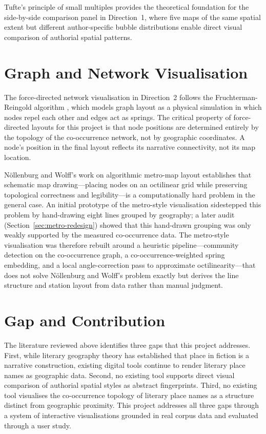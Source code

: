 \documentclass[logo,msc]{infthesis}
\begin{document}
Tufte's principle of small multiples \cite{tufte1983} provides the theoretical foundation for the side-by-side comparison panel in Direction~1, where five maps of the same spatial extent but different author-specific bubble distributions enable direct visual comparison of authorial spatial patterns.
 
\section{Graph and Network Visualisation}
 
The force-directed network visualisation in Direction~2 follows the Fruchterman-Reingold algorithm \cite{fruchterman1991}, which models graph layout as a physical simulation in which nodes repel each other and edges act as springs. The critical property of force-directed layouts for this project is that node positions are determined entirely by the topology of the co-occurrence network, not by geographic coordinates. A node's position in the final layout reflects its narrative connectivity, not its map location.
 
N{\"o}llenburg and Wolff's work on algorithmic metro-map layout \cite{nollenburg2006} establishes that schematic map drawing---placing nodes on an octilinear grid while preserving topological correctness and legibility---is a computationally hard problem in the general case. An initial prototype of the metro-style visualisation sidestepped this problem by hand-drawing eight lines grouped by geography; a later audit (Section~\ref{sec:metro-redesign}) showed that this hand-drawn grouping was only weakly supported by the measured co-occurrence data. The metro-style visualisation was therefore rebuilt around a heuristic pipeline---community detection on the co-occurrence graph, a co-occurrence-weighted spring embedding, and a local angle-correction pass to approximate octilinearity---that does not solve N{\"o}llenburg and Wolff's problem exactly but derives the line structure and station layout from data rather than manual judgment.
 
\section{Gap and Contribution}
 
The literature reviewed above identifies three gaps that this project addresses. First, while literary geography theory has established that place in fiction is a narrative construction, existing digital tools continue to render literary place names as geographic data. Second, no existing tool supports direct visual comparison of authorial spatial styles as abstract fingerprints. Third, no existing tool visualises the co-occurrence topology of literary place names as a structure distinct from geographic proximity. This project addresses all three gaps through a system of interactive visualisations grounded in real corpus data and evaluated through a user study.
 
\end{document}
